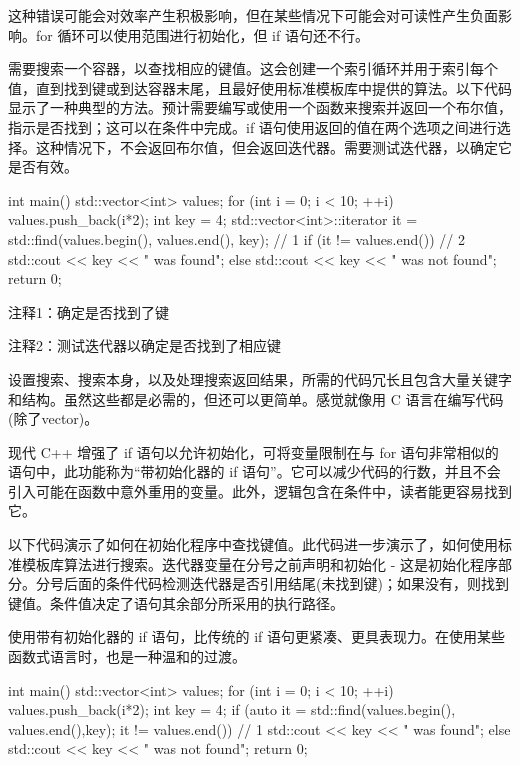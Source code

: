 这种错误可能会对效率产生积极影响，但在某些情况下可能会对可读性产生负面影响。for 循环可以使用范围进行初始化，但 if 语句还不行。


需要搜索一个容器，以查找相应的键值。这会创建一个索引循环并用于索引每个值，直到找到键或到达容器末尾，且最好使用标准模板库中提供的算法。以下代码显示了一种典型的方法。预计需要编写或使用一个函数来搜索并返回一个布尔值，指示是否找到；这可以在条件中完成。if 语句使用返回的值在两个选项之间进行选择。这种情况下，不会返回布尔值，但会返回迭代器。需要测试迭代器，以确定它是否有效。


\begin{cpp}
int main() {
  std::vector<int> values;
  for (int i = 0; i < 10; ++i)
    values.push_back(i*2);
  int key = 4;
  std::vector<int>::iterator it =
  std::find(values.begin(), values.end(), key); // 1
  if (it != values.end()) // 2
    std::cout << key << " was found\n";
  else
    std::cout << key << " was not found\n";
  return 0;
}
\end{cpp}

{\footnotesize
注释1：确定是否找到了键

注释2：测试迭代器以确定是否找到了相应键
}


设置搜索、搜索本身，以及处理搜索返回结果，所需的代码冗长且包含大量关键字和结构。虽然这些都是必需的，但还可以更简单。感觉就像用 C 语言在编写代码(除了vector)。


现代 C++ 增强了 if 语句以允许初始化，可将变量限制在与 for 语句非常相似的语句中，此功能称为“带初始化器的 if 语句”。它可以减少代码的行数，并且不会引入可能在函数中意外重用的变量。此外，逻辑包含在条件中，读者能更容易找到它。

以下代码演示了如何在初始化程序中查找键值。此代码进一步演示了，如何使用标准模板库算法进行搜索。迭代器变量在分号之前声明和初始化 - 这是初始化程序部分。分号后面的条件代码检测迭代器是否引用结尾(未找到键)；如果没有，则找到键值。条件值决定了语句其余部分所采用的执行路径。

使用带有初始化器的 if 语句，比传统的 if 语句更紧凑、更具表现力。在使用某些函数式语言时，也是一种温和的过渡。


\begin{cpp}
int main() {
  std::vector<int> values;
  for (int i = 0; i < 10; ++i)
    values.push_back(i*2);
  int key = 4;
  if (auto it = std::find(values.begin(),
        values.end(),key); it != values.end()) // 1
    std::cout << key << " was found\n";
  else
    std::cout << key << " was not found\n";
  return 0;
}
\end{cpp}

